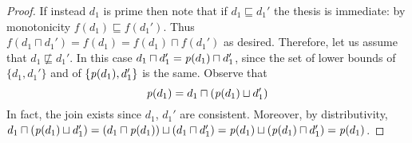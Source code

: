 \begin{proof}
  
  If instead $d_1$ is prime then note that if $d_1 \sqsubseteq d_1'$
  the thesis is immediate: by monotonicity
  $f(d_1) \sqsubseteq f(d_1')$. Thus
  $f(d_1 \sqcap d_1') = f(d_1) = f(d_1)\sqcap f(d_1')$ as
  desired. Therefore, let us assume that $d_1 \not\sqsubseteq
  d_1'$.
  In this case $d_1 \sqcap d_1' = \mathit{p}({d_1}) \sqcap d_1'$, since the set
  of lower bounds of $\{ d_1, d_1'\}$ and of $\{ \mathit{p}({d_1}), d_1' \}$ is
  the same. Observe that
  \begin{equation}
    \label{eq:pad1}
    \mathit{p}({d_1}) = d_1 \sqcap (\mathit{p}({d_1}) \sqcup d_1')
  \end{equation}
  In fact, the join exists since $d_1$, $d_1'$ are consistent. Moreover, by distributivity,
  $d_1 \sqcap (\mathit{p}({d_1}) \sqcup d_1') = (d_1 \sqcap \mathit{p}({d_1}))
  \sqcup (d_1 \sqcap d_1') = \mathit{p}({d_1}) \sqcup (\mathit{p}({d_1}) \sqcap
  d_1') = \mathit{p}({d_1})$.
  

\end{proof}
